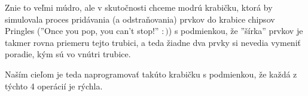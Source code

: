 Znie to veľmi múdro, ale v skutočnosti chceme modrú krabičku, ktorá by simulovala 
proces pridávania (a odstraňovania) prvkov do krabice chipsov Pringles (''Once 
you pop, you can't stop!'' $:)$) s podmienkou, že ''šírka'' prvkov je takmer
rovna priemeru tejto trubici, a teda žiadne dva prvky si nevedia vymeniť poradie, 
kým sú vo vnútri trubice. 

Naším cieľom je teda naprogramovať takúto krabičku s podmienkou, že každá z 
týchto 4 operácií je rýchla. 

